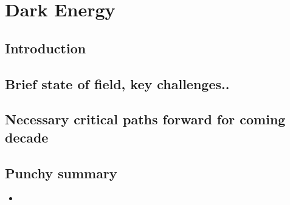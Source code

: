 \section{Dark Energy}

\subsection{Introduction}


\subsection{Brief state of field, key challenges..}


\subsection{Necessary critical paths forward for coming decade}

\subsection{Punchy summary}

\begin{itemize}
    \item 
\end{itemize}